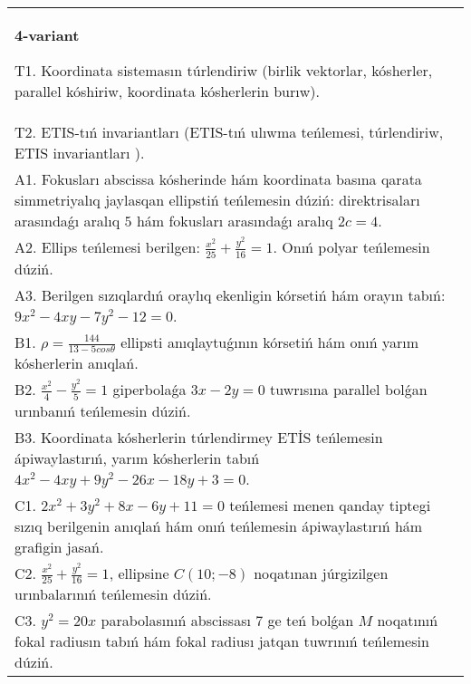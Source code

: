 \documentclass{article}
\begin{document}
\begin{tabular}{m{17cm}}
\textbf{4-variant}
\newline

T1. Koordinata sistemasın túrlendiriw (birlik vektorlar, kósherler, parallel kóshiriw, koordinata kósherlerin burıw).\\

T2. ETIS-tıń invariantları (ETIS-tıń ulıwma teńlemesi, túrlendiriw, ETIS invariantları ).\\

A1. Fokusları abscissa kósherinde hám koordinata basına qarata simmetriyalıq jaylasqan ellipstiń teńlemesin dúziń: direktrisaları arasındaǵı aralıq $5$ hám fokusları arasındaǵı aralıq $2 c=4$.\\

A2. Ellips teńlemesi berilgen: $\frac{x^2}{25}+\frac{y^2}{16}=1$. Onıń polyar teńlemesin dúziń.\\

A3. Berilgen sızıqlardıń oraylıq ekenligin kórsetiń hám orayın tabıń: $9 x^{2}-4 xy-7 y^{2}-12=0$.\\

B1. $\rho = \frac{144}{13 - 5cos\theta}$ ellipsti anıqlaytuǵının kórsetiń hám onıń yarım kósherlerin anıqlań.\\

B2. $\frac{x^{2}}{4} - \frac{y^{2}}{5} = 1$ giperbolaǵa $3x - 2y = 0$ tuwrısına parallel bolǵan urınbanıń teńlemesin dúziń.  \\

B3. Koordinata kósherlerin túrlendirmey ETİS teńlemesin ápiwaylastırıń, yarım kósherlerin tabıń $4x^{2} - 4xy + 9y^{2} - 26x - 18y + 3 = 0$.\\

C1. $2x^{2} + 3y^{2} + 8x - 6y + 11 = 0$ teńlemesi menen qanday tiptegi sızıq berilgenin anıqlań hám onıń teńlemesin ápiwaylastırıń hám grafigin jasań.  \\

C2. $\frac{x^{2}}{25} + \frac{y^{2}}{16} = 1$, ellipsine $C(10; - 8)$ noqatınan júrgizilgen urınbalarınıń teńlemesin dúziń.  \\

C3. $y^{2} = 20x$ parabolasınıń abscissası 7 ge teń bolǵan $M$ noqatınıń fokal radiusın tabıń hám fokal radiusı jatqan tuwrınıń teńlemesin dúziń.  \\

\end{tabular}
\vspace{1cm}
\end{document}
